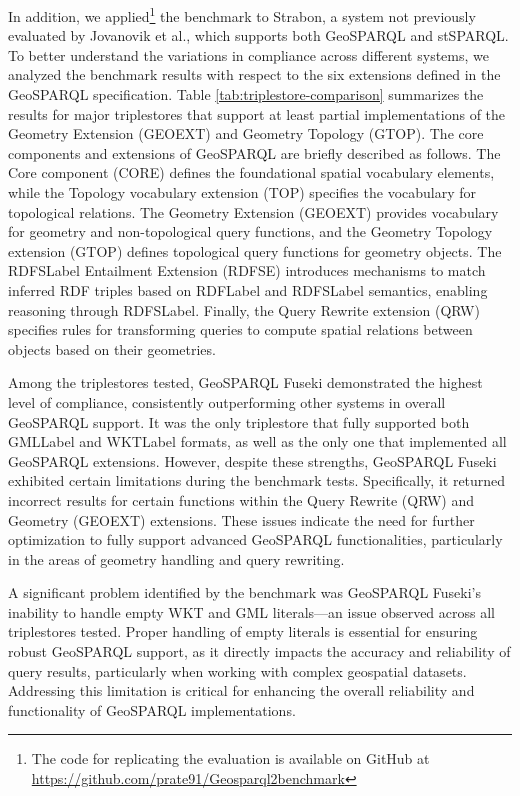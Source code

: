In addition, we applied\footnote{The code for replicating the evaluation is available on GitHub at \url{https://github.com/prate91/Geosparql2benchmark}} the benchmark to Strabon, a system not previously evaluated by Jovanovik et al., which supports both GeoSPARQL and stSPARQL\cite{koubarakisModelingQueryingMetadata2010a}. To better understand the variations in compliance across different systems, we analyzed the benchmark results with respect to the six extensions defined in the GeoSPARQL specification. Table \ref{tab:triplestore-comparison} summarizes the results for major triplestores that support at least partial implementations of the Geometry Extension (GEOEXT) and Geometry Topology (GTOP). The core components and extensions of GeoSPARQL are briefly described as follows. The Core component (CORE) defines the foundational spatial vocabulary elements, while the Topology vocabulary extension (TOP) specifies the vocabulary for topological relations. The Geometry Extension (GEOEXT) provides vocabulary for geometry and non-topological query functions, and the Geometry Topology extension (GTOP) defines topological query functions for geometry objects. The \acrshort{RDFSLabel} Entailment Extension (RDFSE) introduces mechanisms to match inferred RDF triples based on \acrshort{RDFLabel} and \acrshort{RDFSLabel} semantics, enabling reasoning through \acrshort{RDFSLabel}. Finally, the Query Rewrite extension (QRW) specifies rules for transforming queries to compute spatial relations between objects based on their geometries.

Among the triplestores tested, GeoSPARQL Fuseki demonstrated the highest level of compliance, consistently outperforming other systems in overall GeoSPARQL support. It was the only triplestore that fully supported both \acrshort{GMLLabel} and \acrshort{WKTLabel} formats, as well as the only one that implemented all GeoSPARQL extensions. However, despite these strengths, GeoSPARQL Fuseki exhibited certain limitations during the benchmark tests. Specifically, it returned incorrect results for certain functions within the Query Rewrite (QRW) and Geometry (GEOEXT) extensions. These issues indicate the need for further optimization to fully support advanced GeoSPARQL functionalities, particularly in the areas of geometry handling and query rewriting.

A significant problem identified by the benchmark was GeoSPARQL Fuseki’s inability to handle empty WKT and GML literals—an issue observed across all triplestores tested. Proper handling of empty literals is essential for ensuring robust GeoSPARQL support, as it directly impacts the accuracy and reliability of query results, particularly when working with complex geospatial datasets. Addressing this limitation is critical for enhancing the overall reliability and functionality of GeoSPARQL implementations.


